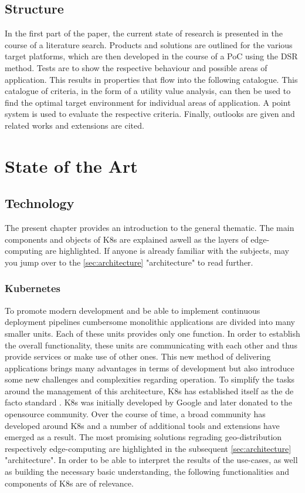\documentclass[MSC,Master,english]{twbook}%
\begin{document}
\section{Structure}
\label{sec:methodology}
\label{sec:structure}
In the first part of the paper, the current state of research is presented in the course of a literature search. Products and solutions are outlined for the various target platforms, which are then developed in the course of a \ac{PoC} using the \ac{DSR} method. Tests are to show the respective behaviour and possible areas of application. This results in properties that flow into the following catalogue. This catalogue of criteria, in the form of a utility value analysis, can then be used to find the optimal target environment for individual areas of application. A point system is used to evaluate the respective criteria. Finally, outlooks are given and related works and extensions are cited.


\chapter{State of the Art}
\label{chap:current}
\section{Technology}
The present chapter provides an introduction to the general thematic. The main components and objects of \ac{K8s} are explained aswell as the layers of edge-computing are highlighted. If anyone is already familiar with the subjects, may you jump over to the \autoref{sec:architecture} "architecture" to read further.
\label{sec:technology}
\subsection{Kubernetes}
To promote modern development and be able to implement continuous deployment pipelines cumbersome monolithic applications are divided into many smaller units. Each of these units provides only one function. In order to establish the overall functionality, these units are communicating with each other and thus provide services or make use of other ones. This new method of delivering applications brings many advantages in terms of development but also introduce some new challenges and complexities regarding operation. To simplify the tasks around the management of this architecture, \ac{K8s} has established itself as the de facto standard \cite{k8ssurv}. \ac{K8s} was initially developed by Google and later donated to the opensource community. Over the course of time, a broad community has developed around \ac{K8s} and a number of additional tools and extensions have emerged as a result. The most promising solutions regrading geo-distribution respectively edge-computing are highlighted in the subsequent \autoref{sec:architecture} "architecture". In order to be able to interpret the results of the use-cases, as well as building the necessary basic understanding, the following functionalities and components of \ac{K8s} are of relevance.  
\end{document}
